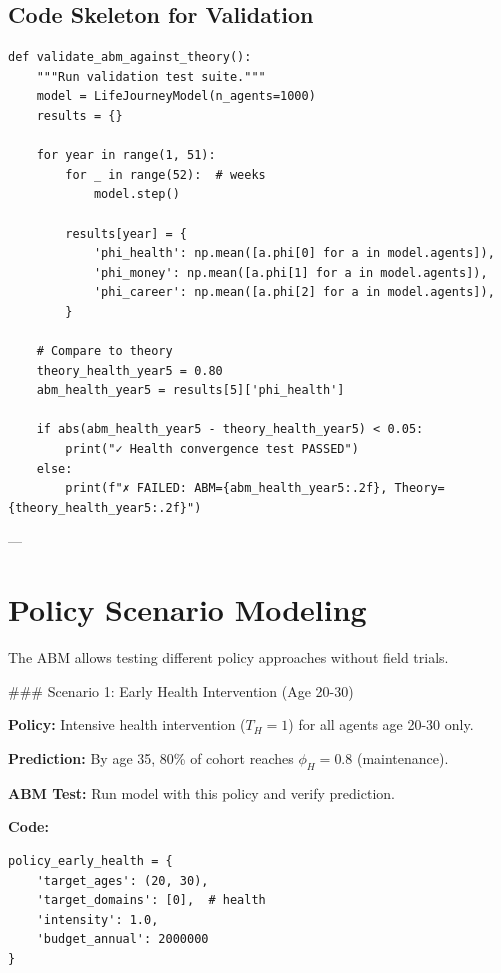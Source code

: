 \subsection{Code Skeleton for Validation}

\begin{verbatim}
def validate_abm_against_theory():
    """Run validation test suite."""
    model = LifeJourneyModel(n_agents=1000)
    results = {}

    for year in range(1, 51):
        for _ in range(52):  # weeks
            model.step()

        results[year] = {
            'phi_health': np.mean([a.phi[0] for a in model.agents]),
            'phi_money': np.mean([a.phi[1] for a in model.agents]),
            'phi_career': np.mean([a.phi[2] for a in model.agents]),
        }

    # Compare to theory
    theory_health_year5 = 0.80
    abm_health_year5 = results[5]['phi_health']

    if abs(abm_health_year5 - theory_health_year5) < 0.05:
        print("✓ Health convergence test PASSED")
    else:
        print(f"✗ FAILED: ABM={abm_health_year5:.2f}, Theory={theory_health_year5:.2f}")
\end{verbatim}

---


\section{Policy Scenario Modeling}
\label{ppp:scenarios}

The ABM allows testing different policy approaches without field trials.

### Scenario 1: Early Health Intervention (Age 20-30)

\textbf{Policy:} Intensive health intervention ($T_H = 1$) for all agents age 20-30 only.

\textbf{Prediction:} By age 35, 80\% of cohort reaches $\phi_H = 0.8$ (maintenance).

\textbf{ABM Test:} Run model with this policy and verify prediction.

\textbf{Code:}

\begin{verbatim}
policy_early_health = {
    'target_ages': (20, 30),
    'target_domains': [0],  # health
    'intensity': 1.0,
    'budget_annual': 2000000
}
\end{verbatim}

